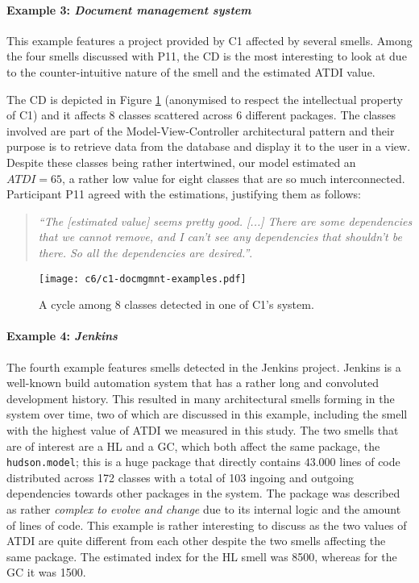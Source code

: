 \paragraph{Example 3: \emph{Document management system}}
This example features a project provided by C1 affected by several smells.
Among the four smells discussed with P11, the CD is the most interesting to look at due to the counter-intuitive nature of the smell and the estimated ATDI value.

The CD is depicted in Figure \ref{c6:fig:c1-docmgmnt-examples} (anonymised to respect the intellectual property of C1) and it affects 8 classes scattered across 6 different packages. 
The classes involved are part of the Model-View-Controller architectural pattern and their purpose is to retrieve data from the database and display it to the user in a view.
Despite these classes being rather intertwined, our model estimated an $ATDI = 65$, a rather low value for eight classes that are so much interconnected. Participant P11 agreed with the estimations, justifying them as follows:

\begin{quote}
    \emph{``The [estimated value] seems pretty good. [...] There are some dependencies that we cannot remove, and I can't see any dependencies that shouldn't be there. So all the dependencies are desired.''}.  
\end{quote}

\begin{figure}
    \centering
    \texttt{[image: c6/c1-docmgmnt-examples.pdf]}
    \caption{A cycle among 8 classes detected in one of C1's system.}
    \label{c6:fig:c1-docmgmnt-examples}
\end{figure}

\paragraph{Example 4: \emph{Jenkins}}
The fourth example features smells detected in the Jenkins project.
Jenkins is a well-known build automation system that has a rather long and convoluted development history.
This resulted in many architectural smells forming in the system over time, two of which are discussed in this example, including the smell with the highest value of ATDI we measured in this study.
The two smells that are of interest are a HL and a GC, which both affect the same package, the \texttt{hudson.model}; this is a huge package that directly contains $43.000$ lines of code distributed across 172 classes with a total of 103 ingoing and outgoing dependencies towards other packages in the system.
The package was described as rather \emph{complex to evolve and change} due to its internal logic and the amount of lines of code.
This example is rather interesting to discuss as the two values of ATDI are quite different from each other despite the two smells affecting the same package.
The estimated index for the HL smell was 8500, whereas for the GC it was 1500.

